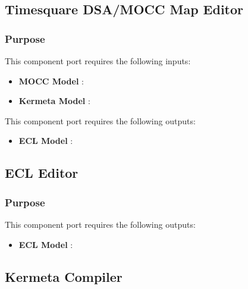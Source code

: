 \documentclass{gemoc} %
\begin{document}
\subsection{Timesquare DSA/MOCC Map Editor}


\subsubsection{Purpose}

This component port requires the following inputs:
\begin{itemize}
  \item \textbf{MOCC Model} :
  \item \textbf{Kermeta Model} :
\end{itemize}

This component port requires the following outputs:
\begin{itemize}
  \item \textbf{ECL Model} :
\end{itemize}

\subsection{ECL Editor}


\subsubsection{Purpose}


This component port requires the following outputs:
\begin{itemize}
  \item \textbf{ECL Model} :
\end{itemize}

\subsection{Kermeta Compiler}
\end{document}
